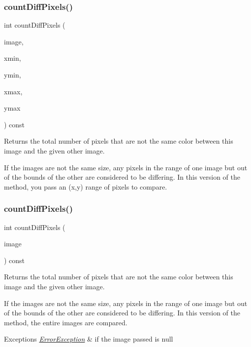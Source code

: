 \subsubsection{\texorpdfstring{count\+Diff\+Pixels()}{countDiffPixels()}\hspace{0.1cm}{\footnotesize\ttfamily [2/4]}}
{\footnotesize\ttfamily int count\+Diff\+Pixels (\begin{DoxyParamCaption}\item[{const \mbox{\hyperlink{classGCanvas}{G\+Canvas}} \&}]{image,  }\item[{int}]{xmin,  }\item[{int}]{ymin,  }\item[{int}]{xmax,  }\item[{int}]{ymax }\end{DoxyParamCaption}) const\hspace{0.3cm}{\ttfamily [virtual]}}



Returns the total number of pixels that are not the same color between this image and the given other image. 

If the images are not the same size, any pixels in the range of one image but out of the bounds of the other are considered to be differing. In this version of the method, you pass an (x,y) range of pixels to compare. \mbox{\label{classGCanvas_a443b0f63a197c0f1147b13077f4206e0}} 
\subsubsection{\texorpdfstring{count\+Diff\+Pixels()}{countDiffPixels()}\hspace{0.1cm}{\footnotesize\ttfamily [3/4]}}
{\footnotesize\ttfamily int count\+Diff\+Pixels (\begin{DoxyParamCaption}\item[{const \mbox{\hyperlink{classGCanvas}{G\+Canvas}} $\ast$}]{image }\end{DoxyParamCaption}) const\hspace{0.3cm}{\ttfamily [virtual]}}



Returns the total number of pixels that are not the same color between this image and the given other image. 

If the images are not the same size, any pixels in the range of one image but out of the bounds of the other are considered to be differing. In this version of the method, the entire images are compared. 
\begin{DoxyExceptions}{Exceptions}
{\em \mbox{\hyperlink{classErrorException}{Error\+Exception}}} & if the image passed is null \\
\hline
\end{DoxyExceptions}
\mbox{\label{classGCanvas_a77b38a94630c93ecc697fb12a1fb89fd}} 
